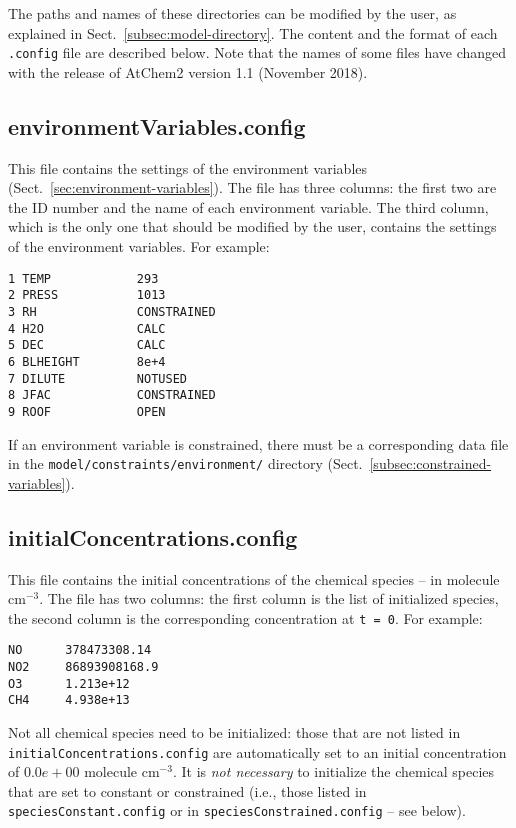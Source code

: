 The paths and names of these directories can be modified by the user,
as explained in Sect.~\ref{subsec:model-directory}. The content and
the format of each \texttt{.config} file are described below. Note
that the names of some files have changed with the release of AtChem2
version 1.1 (November 2018).

\subsection{environmentVariables.config} \label{subsec:environmentvariables}

This file contains the settings of the environment variables
(Sect.~\ref{sec:environment-variables}). The file has three columns:
the first two are the ID number and the name of each
environment variable. The third column, which is the only one that
should be modified by the user, contains the settings of the
environment variables. For example:

\begin{verbatim}
1 TEMP            293
2 PRESS           1013
3 RH              CONSTRAINED
4 H2O             CALC
5 DEC             CALC
6 BLHEIGHT        8e+4
7 DILUTE          NOTUSED
8 JFAC            CONSTRAINED
9 ROOF            OPEN
\end{verbatim}

If an environment variable is constrained, there must be a
corresponding data file in the \texttt{model/constraints/environment/}
directory (Sect.~\ref{subsec:constrained-variables}).

\subsection{initialConcentrations.config} \label{subsec:initialconcentrations}

This file contains the initial concentrations of the chemical species
-- in molecule cm$^{-3}$. The file has two columns: the first column
is the list of initialized species, the second column is the
corresponding concentration at \texttt{t\ =\ 0}. For example:

\begin{verbatim}
NO      378473308.14
NO2     86893908168.9
O3      1.213e+12
CH4     4.938e+13
\end{verbatim}

Not all chemical species need to be initialized: those that are not
listed in \texttt{initialConcentrations.config} are automatically set
to an initial concentration of $0.0e+00$ molecule cm$^{-3}$. It is
\emph{not necessary} to initialize the chemical species that are set
to constant or constrained (i.e., those listed in
\texttt{speciesConstant.config} or in
\texttt{speciesConstrained.config} -- see below).

